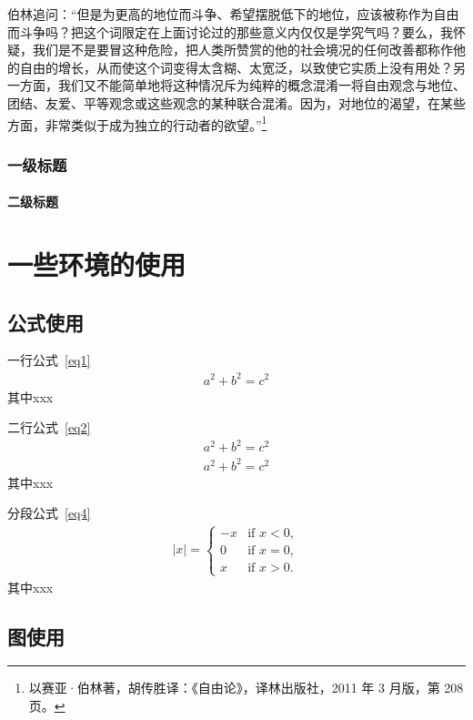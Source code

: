 \documentclass{BFSU-master-thesis}
\begin{document}
伯林追问：“但是为更高的地位而斗争、希望摆脱低下的地位，应该被称作为自由而斗争吗？把这个词限定在上面讨论过的那些意义内仅仅是学究气吗？要么，我怀疑，我们是不是要冒这种危险，把人类所赞赏的他的社会境况的任何改善都称作他的自由的增长，从而使这个词变得太含糊、太宽泛，以致使它实质上没有用处？另一方面，我们又不能简单地将这种情况斥为纯粹的概念混淆一将自由观念与地位、团结、友爱、平等观念或这些观念的某种联合混淆。因为，对地位的渴望，在某些方面，非常类似于成为独立的行动者的欲望。”\footnote{以赛亚·伯林著，胡传胜译：《自由论》，译林出版社，2011 年 3 月版，第 208 页。}

\subsection{一级标题}

\zhlipsum[1-1]

\subsubsection{二级标题}

\zhlipsum[1-3]     %

\chapter{一些环境的使用}

\section{公式使用}
 一行公式~\eqref{eq1}
\begin{align}
\label{eq1}
a^2+b^2=c^2
\end{align}
其中xxx

 二行公式~\eqref{eq2}
\begin{align}
\label{eq2}
a^2+b^2=c^2\\
\label{eq3}
a^2+b^2=c^2
\end{align}
其中xxx

 分段公式~\eqref{eq4}
\begin{align}
\label{eq4}
|x| =
\begin{cases}
-x & \text{if } x < 0,\\
0 & \text{if } x = 0,\\
x & \text{if } x > 0.
\end{cases}
\end{align}
其中xxx

\section{图使用}
\end{document}
